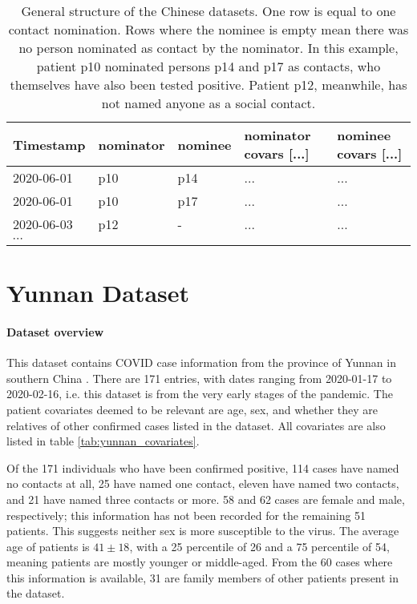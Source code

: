\begin{table}
	\begin{mdframed}
		\begin{tabularx}{\linewidth}{XXXXX}
		\hline
		\textbf{Timestamp} & \textbf{nominator} & \textbf{nominee} & \textbf{nominator covars [...]} & \textbf{nominee covars [...]} \\
		\hline
		2020-06-01 & p10 & p14 & ... & ... \\
		2020-06-01 & p10 & p17 & ... & ... \\
		2020-06-03 & p12 & - & ... & ... \\
		$\cdots$ & & & & \\
	\end{tabularx}
	\caption{General structure of the Chinese datasets. One row is equal to one contact nomination. Rows where the nominee is empty mean there was no person nominated as contact by the nominator. In this example, patient p10 nominated persons p14 and p17 as contacts, who themselves have also been tested positive. Patient p12, meanwhile, has not named anyone as a social contact.}
	\label{tab:china_data_structure}
	\end{mdframed}
\end{table}

\section{Yunnan Dataset}
\label{sec:yunnan_data}

\paragraph{Dataset overview} This dataset contains COVID case information from the province of Yunnan in southern China \cite{hainan_data}. There are 171 entries, with dates ranging from 2020-01-17 to 2020-02-16, i.e. this dataset is from the very early stages of the pandemic. The patient covariates deemed to be relevant are age, sex, and whether they are relatives of other confirmed cases listed in the dataset. All covariates are also listed in table \ref{tab:yunnan_covariates}.

Of the 171 individuals who have been confirmed positive, 114 cases have named no contacts at all, 25 have named one contact, eleven have named two contacts, and 21 have named three contacts or more. 58 and 62 cases are female and male, respectively; this information has not been recorded for the remaining 51 patients. This suggests neither sex is more susceptible to the virus. The average age of patients is $41\pm18$, with a 25 percentile of 26 and a 75 percentile of 54, meaning patients are mostly younger or middle-aged. From the 60 cases where this information is available, 31 are family members of other patients present in the dataset. 


